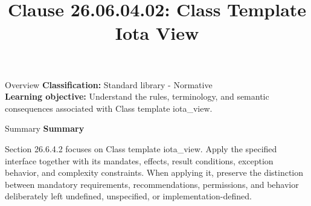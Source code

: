 \documentclass[10pt,letterpaper]{article}
\title{Clause 26.06.04.02: Class Template Iota View}
\author{}
\date{}
\begin{document}
\maketitle
\begin{CornellOverviewBox}{Overview}
\textbf{Classification:} Standard library - Normative\\[2pt]
\textbf{Learning objective:} Understand the rules, terminology, and semantic consequences associated with Class template iota\_view.
\end{CornellOverviewBox}\begin{CornellSummaryBox}{Summary}
{\sffamily\bfseries\color{Accent} Summary}\par\vspace{3pt}Section 26.6.4.2 focuses on Class template iota\_view. Apply the specified interface together with its mandates, effects, result conditions, exception behavior, and complexity constraints. When applying it, preserve the distinction between mandatory requirements, recommendations, permissions, and behavior deliberately left undefined, unspecified, or implementation-defined.
\end{CornellSummaryBox}
\end{document}
